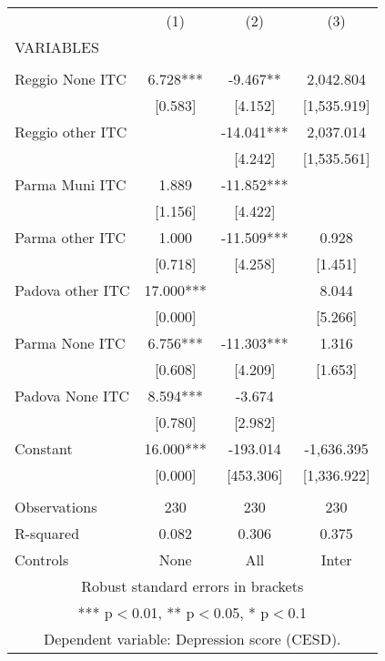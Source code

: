 \begin{tabular}{lccc} \hline
 & (1) & (2) & (3) \\
VARIABLES &  &  &  \\ \hline
 &  &  &  \\
Reggio None ITC & 6.728*** & -9.467** & 2,042.804 \\
 & [0.583] & [4.152] & [1,535.919] \\
Reggio other ITC &  & -14.041*** & 2,037.014 \\
 &  & [4.242] & [1,535.561] \\
Parma Muni ITC & 1.889 & -11.852*** &  \\
 & [1.156] & [4.422] &  \\
Parma other ITC & 1.000 & -11.509*** & 0.928 \\
 & [0.718] & [4.258] & [1.451] \\
Padova other ITC & 17.000*** &  & 8.044 \\
 & [0.000] &  & [5.266] \\
Parma None ITC & 6.756*** & -11.303*** & 1.316 \\
 & [0.608] & [4.209] & [1.653] \\
Padova None ITC & 8.594*** & -3.674 &  \\
 & [0.780] & [2.982] &  \\
Constant & 16.000*** & -193.014 & -1,636.395 \\
 & [0.000] & [453.306] & [1,336.922] \\
 &  &  &  \\
Observations & 230 & 230 & 230 \\
R-squared & 0.082 & 0.306 & 0.375 \\
 Controls & None & All & Inter \\ \hline
\multicolumn{4}{c}{ Robust standard errors in brackets} \\
\multicolumn{4}{c}{ *** p$<$0.01, ** p$<$0.05, * p$<$0.1} \\
\multicolumn{4}{c}{ Dependent variable: Depression score (CESD).} \\
\end{tabular}
